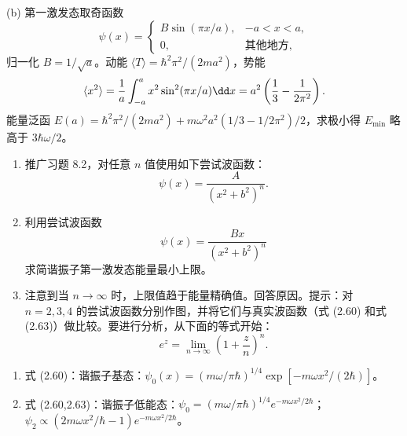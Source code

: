 \begin{solution}
(b) 第一激发态取奇函数
\[
\psi(x)=\begin{cases}
B\sin(\pi x/a), & -a<x<a,\\
0, & \text{其他地方},
\end{cases}
\]
归一化 $B=1/\sqrt{a}$。动能 $\langle T\rangle=\hbar^2\pi^2/(2ma^2)$，势能
\[
\langle x^2\rangle={1\over a}\int_{-a}^a x^2\sin^2(\pi x/a)\dd x=a^2\left({1\over3}-{1\over2\pi^2}\right).
\]
能量泛函 $E(a)=\hbar^2\pi^2/(2ma^2)+m\omega^2a^2(1/3-1/2\pi^2)/2$，求极小得 $E_{\min}$ 略高于 $3\hbar\omega/2$。
\end{solution}

\begin{question}
\begin{enumerate}
\item 推广习题 8.2，对任意 $n$ 值使用如下尝试波函数：
\[
\psi(x)=\frac{A}{(x^2+b^2)^n}.
\]
\item 利用尝试波函数
\[
\psi(x)=\frac{Bx}{(x^2+b^2)^n}
\]
求简谐振子第一激发态能量最小上限。
\item 注意到当 $n\to\infty$ 时，上限值趋于能量精确值。回答原因。提示：对 $n=2,3,4$ 的尝试波函数分别作图，并将它们与真实波函数（式 (2.60) 和式 (2.63)）做比较。要进行分析，从下面的等式开始：
\[
 e^z=\lim_{n\to\infty}\left(1+\frac{z}{n}\right)^n.
\]
\end{enumerate}

\par\smallskip
{}
\begin{enumerate}[leftmargin=2.2em,itemsep=0.12em,topsep=0.12em,parsep=0pt]
\item 式 (2.60)：谐振子基态：$\psi_0(x)=(m\omega/\pi\hbar)^{1/4}\exp[-m\omega x^2/(2\hbar)]$。
\item 式 (2.60,2.63)：谐振子低能态：$\psi_0=(m\omega/\pi\hbar)^{1/4}e^{-m\omega x^2/2\hbar}$；$\psi_2\propto(2m\omega x^2/\hbar-1)e^{-m\omega x^2/2\hbar}$。
\end{enumerate}

\end{question}

